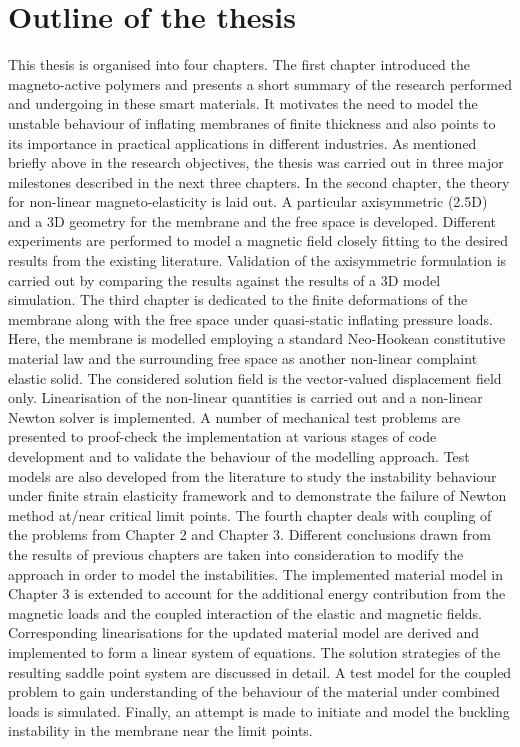 \section{Outline of the thesis}
This thesis is organised into four chapters. The first chapter introduced the magneto-active polymers and presents a short summary of the research performed and undergoing in these smart materials. It motivates the need to model the unstable behaviour of inflating membranes of finite thickness and also points to its importance in practical applications in different industries. As mentioned briefly above in the research objectives, the thesis was carried out in three major milestones described in the next three chapters. In the second chapter, the theory for non-linear magneto-elasticity is laid out. A particular axisymmetric (2.5D) and a 3D geometry for the membrane and the free space is developed. Different experiments are performed to model a magnetic field closely fitting to the desired results from the existing literature. Validation of the axisymmetric formulation is carried out by comparing the results against the results of a 3D model simulation. The third chapter is dedicated to the finite deformations of the membrane along with the free space under quasi-static inflating pressure loads. Here, the membrane is modelled employing a standard Neo-Hookean constitutive material law and the surrounding free space as another non-linear complaint elastic solid. The considered solution field is the vector-valued displacement field only. Linearisation of the non-linear quantities is carried out and a non-linear Newton solver is implemented. A number of mechanical test problems are presented to proof-check the implementation at various stages of code development and to validate the behaviour of the modelling approach. Test models are also developed from the literature to study the instability behaviour under finite strain elasticity framework and to demonstrate the failure of Newton method at/near critical limit points. The fourth chapter deals with coupling of the problems from Chapter 2 and Chapter 3. Different conclusions drawn from the results of previous chapters are taken into consideration to modify the approach in order to model the instabilities. The implemented material model in Chapter 3 is extended to account for the additional energy contribution from the magnetic loads and the coupled interaction of the elastic and magnetic fields. Corresponding linearisations for the updated material model are derived and implemented to form a linear system of equations. The solution strategies of the resulting saddle point system are discussed in detail. A test model for the coupled problem to gain understanding of the behaviour of the material under combined loads is simulated. Finally, an attempt is made to initiate and model the buckling instability in the membrane near the limit points.